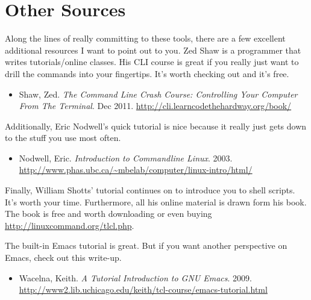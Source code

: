 \documentclass[]{tufte-handout}
\begin{document}
\section{Other Sources}

Along the lines of really committing to these tools, there are a few excellent additional resources I want to point out to you. Zed Shaw is a programmer that writes tutorials/online classes.  His CLI course is great if you really just want to drill the commands into your fingertips.  It's worth checking out and it's free.
\begin{itemize}
\item Shaw, Zed. \textit{The Command Line Crash Course: Controlling Your Computer From The Terminal}. Dec 2011. \url{http://cli.learncodethehardway.org/book/}
\end{itemize}
Additionally, Eric Nodwell's quick tutorial is nice because it really just gets down to the stuff you use most often.
\begin{itemize}
\item Nodwell, Eric. \textit{Introduction to Commandline Linux}. 2003. \url{http://www.phas.ubc.ca/~mbelab/computer/linux-intro/html/}
\end{itemize}
Finally, William Shotts' tutorial continues on to introduce you to shell scripts. It's worth your time.  Furthermore, all his online material is drawn form his book.  The book is free and worth downloading or even buying \url{http://linuxcommand.org/tlcl.php}.

The built-in Emacs tutorial is great. But if you want another perspective on Emacs, check out this write-up.
\begin{itemize}
\item Wacelna, Keith. \textit{A Tutorial Introduction to GNU Emacs}. 2009. \url{http://www2.lib.uchicago.edu/keith/tcl-course/emacs-tutorial.html}
\end{itemize}
\end{document}
